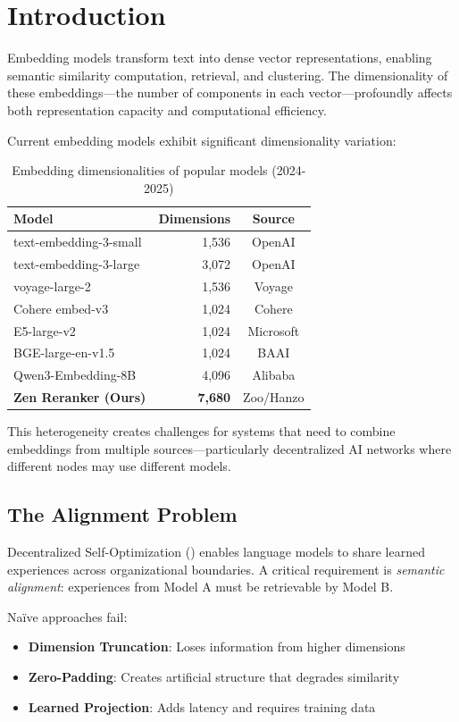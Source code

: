 \section{Introduction}


Embedding models transform text into dense vector representations, enabling semantic similarity computation, retrieval, and clustering. The dimensionality of these embeddings---the number of components in each vector---profoundly affects both representation capacity and computational efficiency.

Current embedding models exhibit significant dimensionality variation:

\begin{table}[h]
\centering
\caption{Embedding dimensionalities of popular models (2024-2025)}
\label{tab:dims}
\begin{tabular}{lrc}
\toprule
\textbf{Model} & \textbf{Dimensions} & \textbf{Source} \\
\midrule
text-embedding-3-small & 1,536 & OpenAI \\
text-embedding-3-large & 3,072 & OpenAI \\
voyage-large-2 & 1,536 & Voyage \\
Cohere embed-v3 & 1,024 & Cohere \\
E5-large-v2 & 1,024 & Microsoft \\
BGE-large-en-v1.5 & 1,024 & BAAI \\
Qwen3-Embedding-8B & 4,096 & Alibaba \\
\textbf{Zen Reranker (Ours)} & \textbf{7,680} & Zoo/Hanzo \\
\bottomrule
\end{tabular}
\end{table}

This heterogeneity creates challenges for systems that need to combine embeddings from multiple sources---particularly decentralized AI networks where different nodes may use different models.

\subsection{The Alignment Problem}

Decentralized Self-Optimization (\DSO{}) enables language models to share learned experiences across organizational boundaries. A critical requirement is \emph{semantic alignment}: experiences from Model A must be retrievable by Model B.

Na\"ive approaches fail:
\begin{itemize}
    \item \textbf{Dimension Truncation}: Loses information from higher dimensions
    \item \textbf{Zero-Padding}: Creates artificial structure that degrades similarity
    \item \textbf{Learned Projection}: Adds latency and requires training data
\end{itemize}

